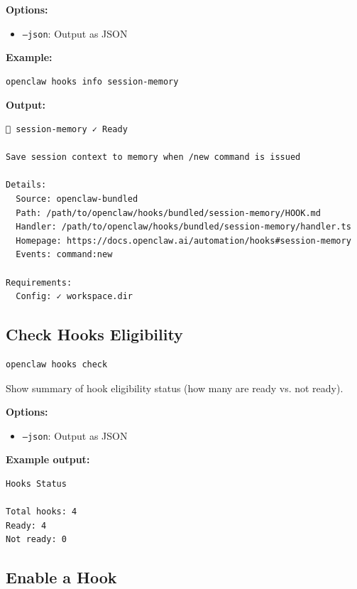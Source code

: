 \textbf{Options:}

\begin{itemize}
  \item \texttt{--json}: Output as JSON
\end{itemize}


\textbf{Example:}

\begin{lstlisting}[language=bash]
openclaw hooks info session-memory
\end{lstlisting}


\textbf{Output:}

\begin{lstlisting}
💾 session-memory ✓ Ready

Save session context to memory when /new command is issued

Details:
  Source: openclaw-bundled
  Path: /path/to/openclaw/hooks/bundled/session-memory/HOOK.md
  Handler: /path/to/openclaw/hooks/bundled/session-memory/handler.ts
  Homepage: https://docs.openclaw.ai/automation/hooks#session-memory
  Events: command:new

Requirements:
  Config: ✓ workspace.dir
\end{lstlisting}


\subsection{Check Hooks Eligibility}


\begin{lstlisting}[language=bash]
openclaw hooks check
\end{lstlisting}


Show summary of hook eligibility status (how many are ready vs. not ready).

\textbf{Options:}

\begin{itemize}
  \item \texttt{--json}: Output as JSON
\end{itemize}


\textbf{Example output:}

\begin{lstlisting}
Hooks Status

Total hooks: 4
Ready: 4
Not ready: 0
\end{lstlisting}


\subsection{Enable a Hook}


